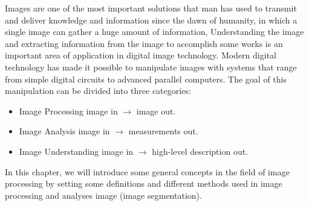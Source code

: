 
\hspace{1cm}Images are one of the most important solutions that man has used to transmit and deliver knowledge and information since the dawn of humanity, in which a single image can gather a huge amount of information, Understanding the image and extracting information from the image to accomplish some works is an important area of application in digital image technology.
Modern digital technology has made it possible to manipulate images with systems that range from simple digital circuits to advanced parallel computers. The goal of this manipulation can be divided into three categories:
\begin{itemize}
    \item Image Processing\hspace{2cm} image in $\rightarrow$ image out.
    \item Image Analysis\hspace{2.4cm} image in $\rightarrow$ measurements out.
    \item Image Understanding\hspace{1.3cm} image in $\rightarrow$ high-level description out.
\end{itemize}
\hspace{1cm}In this chapter, we will introduce some general concepts in the field of image processing by setting some definitions and different methods used in image processing and analyses image (image segmentation).
